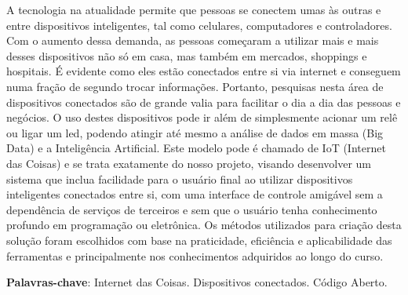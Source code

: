 \documentclass[../../layout.tex]{subfiles}
\begin{document}
\begin{resumo}
\hspace*{3em}
A tecnologia na atualidade permite que pessoas se conectem umas às outras e entre dispositivos inteligentes, tal como celulares, computadores e controladores. Com o aumento dessa demanda, as pessoas começaram a utilizar mais e mais desses dispositivos não só em casa, mas também em mercados, shoppings e hospitais. É evidente como eles estão conectados entre si via internet e conseguem numa fração de segundo trocar informações. Portanto, pesquisas nesta área de dispositivos conectados são de grande valia para facilitar o dia a dia das pessoas e negócios. O uso destes dispositivos pode ir além de simplesmente acionar um relê ou ligar um led, podendo atingir até mesmo a análise de dados em massa (Big Data) e a Inteligência Artificial. Este modelo pode é chamado de IoT (Internet das Coisas) e se trata exatamente do nosso projeto, visando desenvolver um sistema que inclua facilidade para o usuário final ao utilizar dispositivos inteligentes conectados entre si, com uma interface de controle amigável sem a dependência de serviços de terceiros e sem que o usuário tenha conhecimento profundo em programação ou eletrônica. Os métodos utilizados para criação desta solução foram escolhidos com base na praticidade, eficiência e aplicabilidade das ferramentas e principalmente nos conhecimentos adquiridos ao longo do curso.
\vspace{\onelineskip}

\noindent
\textbf{Palavras-chave}: Internet das Coisas. Dispositivos conectados. Código Aberto.
\end{resumo}
\end{document}
